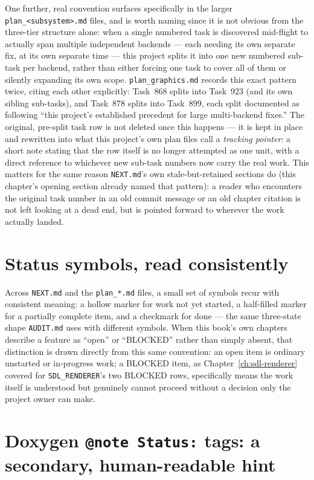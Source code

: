 One further, real convention surfaces specifically in the larger \texttt{plan\_<subsystem>.md}
files, and is worth naming since it is not obvious from the three-tier structure alone: when a
single numbered task is discovered mid-flight to actually span multiple independent backends ---
each needing its own separate fix, at its own separate time --- this project splits it into one
new numbered sub-task per backend, rather than either forcing one task to cover all of them or
silently expanding its own scope. \texttt{plan\_graphics.md} records this exact pattern twice,
citing each other explicitly: Task~868 splits into Task~923 (and its own sibling sub-tasks), and
Task~878 splits into Task~899, each split documented as following ``this project's established
precedent for large multi-backend fixes.'' The original, pre-split task row is not deleted once
this happens --- it is kept in place and rewritten into what this project's own plan files call
a \emph{tracking pointer}: a short note stating that the row itself is no longer attempted as one
unit, with a direct reference to whichever new sub-task numbers now carry the real work. This
matters for the same reason \texttt{NEXT.md}'s own stale-but-retained sections do
(this chapter's opening section already named that pattern): a reader who
encounters the original task number in an old commit message or an old chapter citation is not
left looking at a dead end, but is pointed forward to wherever the work actually landed.

\section{Status symbols, read consistently}

Across \texttt{NEXT.md} and the \texttt{plan\_*.md} files, a small set of symbols recur with
consistent meaning: a hollow marker for work not yet started, a half-filled marker for a
partially complete item, and a checkmark for done --- the same three-state shape
\texttt{AUDIT.md} uses with different symbols. When this book's own chapters describe a
feature as ``open'' or ``BLOCKED'' rather than simply absent, that distinction is drawn
directly from this same convention: an open item is ordinary unstarted or in-progress work; a
BLOCKED item, as Chapter~\ref{ch:sdl-renderer} covered for \texttt{SDL\_RENDERER}'s two
BLOCKED rows, specifically means the work itself is understood but genuinely cannot proceed
without a decision only the project owner can make.

\section{Doxygen \texttt{@note Status:} tags: a secondary, human-readable hint}

